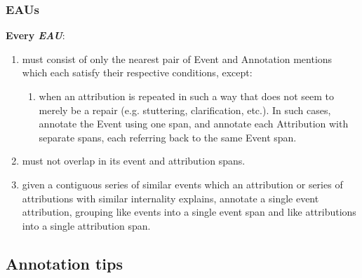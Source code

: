 \documentclass[a4paper,12pt]{article}
\begin{document}
    \subsubsection{EAUs}
    \textbf{Every \emph{EAU}}:
        \begin{enumerate}
            \item must consist of only the nearest pair of Event and Annotation mentions which each satisfy their respective conditions, except:
                \begin{enumerate}
                    \item when an attribution is repeated in such a way that does not seem to merely be a repair (e.g. stuttering, clarification, etc.). In such cases, annotate the Event using one span, and annotate each Attribution with separate spans, each referring back to the same Event span.
                \end{enumerate}
            \item must not overlap in its event and attribution spans.
            \item given a contiguous series of similar events which an attribution or series of attributions with similar internality explains, annotate a single event attribution, grouping like events into a single event span and like attributions into a single attribution span.
        \end{enumerate}


    \subsection{Annotation tips}
\end{document}
